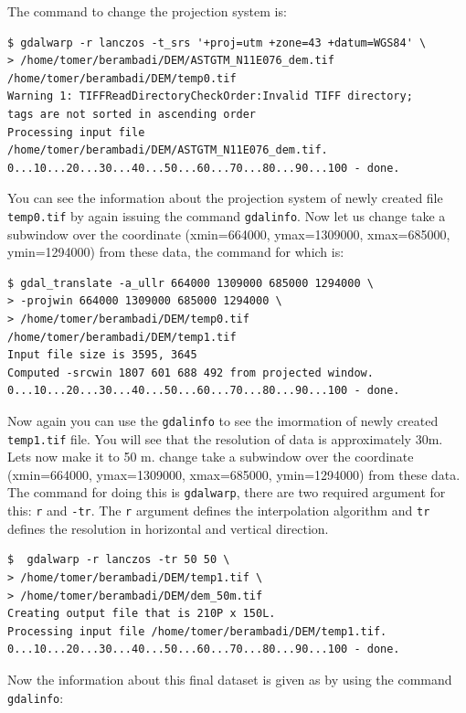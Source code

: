 \documentclass[10pt]{book}
\begin{document}
The command to change the projection system is:
\beforeverb \begin{verbatim}
$ gdalwarp -r lanczos -t_srs '+proj=utm +zone=43 +datum=WGS84' \
> /home/tomer/berambadi/DEM/ASTGTM_N11E076_dem.tif /home/tomer/berambadi/DEM/temp0.tif
Warning 1: TIFFReadDirectoryCheckOrder:Invalid TIFF directory; 
tags are not sorted in ascending order
Processing input file /home/tomer/berambadi/DEM/ASTGTM_N11E076_dem.tif.
0...10...20...30...40...50...60...70...80...90...100 - done.
\end{verbatim} \afterverb
You can see the information about the projection system of newly created file \verb"temp0.tif" by again issuing the command \verb"gdalinfo". Now let us change take a subwindow over the coordinate (xmin=664000, ymax=1309000, xmax=685000, ymin=1294000) from these data, the command for which is:
\beforeverb \begin{verbatim}
$ gdal_translate -a_ullr 664000 1309000 685000 1294000 \
> -projwin 664000 1309000 685000 1294000 \
> /home/tomer/berambadi/DEM/temp0.tif /home/tomer/berambadi/DEM/temp1.tif
Input file size is 3595, 3645
Computed -srcwin 1807 601 688 492 from projected window.
0...10...20...30...40...50...60...70...80...90...100 - done.
\end{verbatim} \afterverb
Now again you can use the \verb"gdalinfo" to see the imormation of newly created \verb"temp1.tif" file. You will see that the resolution of data is approximately 30m. Lets now make it to 50 m.
change take a subwindow over the coordinate (xmin=664000, ymax=1309000, xmax=685000, ymin=1294000) from these data. The command for doing this is \verb"gdalwarp", there are two required argument for this: \verb"r" and \verb"-tr". The \verb"r" argument defines the interpolation algorithm and \verb"tr" defines the resolution in horizontal and vertical direction. 
\beforeverb \begin{verbatim}
$  gdalwarp -r lanczos -tr 50 50 \
> /home/tomer/berambadi/DEM/temp1.tif \
> /home/tomer/berambadi/DEM/dem_50m.tif
Creating output file that is 210P x 150L.
Processing input file /home/tomer/berambadi/DEM/temp1.tif.
0...10...20...30...40...50...60...70...80...90...100 - done.
\end{verbatim} \afterverb
Now the information about this final dataset is given as by using the command \verb"gdalinfo":
\end{document}
